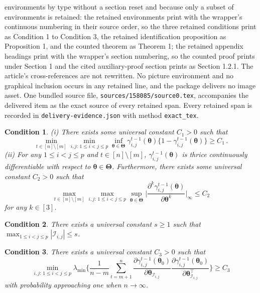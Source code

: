 \documentclass[10pt,a4paper]{amsart}
\theoremstyle{plain}
\newtheorem{condition}{Condition}
\theoremstyle{remark}
\newcommand{\btheta}{\boldsymbol \theta}
\newcommand{\bTheta}{\boldsymbol \Theta}
\def\T{{\scriptscriptstyle \top} }
\begin{document}
environments by type without a section reset and because only a subset of environments is retained: the retained environments print with the wrapper's continuous numbering in their source order, so the three retained conditions print as Condition 1 to Condition 3, the retained identification proposition as Proposition 1, and the counted theorem as Theorem 1; the retained appendix headings print with the wrapper's section numbering, so the counted proof prints under Section 1 and the cited auxiliary-proof section prints as Section 1.2.1. The article's cross-references are not rewritten. No picture environment and no graphical inclusion occurs in any retained line, and the package delivers no image asset. One bundled source file, \texttt{sources/158085/source0.tex}, accompanies the delivered item as the exact source of every retained span. Every retained span is recorded in \texttt{delivery-evidence.json} with method \texttt{exact\_tex}.
\begin{condition}\label{as:gambd}
{\rm(i)} There exists some universal constant $C_{1}>0$ such that
\[
\min_{t\in[n]\setminus[m]}\min_{i,j:\,1\leq i<j\leq p}\inf_{\btheta\in\bTheta}\gamma_{i,j}^{t-1}(\btheta)\{1-\gamma_{i,j}^{t-1}(\btheta)\}\geq C_1\,.
\]
{\rm (ii)} For any $1\leq i<j\leq p$ and $t\in[n]\setminus[m]$, $\gamma_{i,j}^{t-1}(\btheta)$ is thrice continuously
differentiable with respect to $\btheta\in\bTheta$. Furthermore, there exists some universal constant
$C_{2}>0$ such that
\[
\max_{t\in[n]\setminus[m]}\max_{i,j:\,1\leq i<j\leq p}\sup_{\btheta\in\bTheta}\bigg|\frac{\partial^k \gamma_{i,j}^{t-1}(\btheta)}{\partial\btheta^k}\bigg|_\infty\leq C_2
\]
for any $k\in[3]$.
\end{condition}

\begin{condition}\label{as:bdSij}
There exists a universal constant $s\geq1$ such that
$
\max_{1\leq i<j\leq p}|\mathcal{I}_{i,j}|\leq s
$.
\end{condition}

\begin{condition}\label{as:eigen}
There exists a universal constant $C_3>0$ such that
\[
\min_{i,j:\,1\leq i<j\leq p}\lambda_{\min}\bigg\{\frac{1}{n-m}\sum_{t=m+1}^n\frac{\partial\gamma_{i,j}^{t-1}(\btheta_0)}{\partial\btheta_{\mathcal{I}_{i,j}}}\frac{\partial\gamma_{i,j}^{t-1}(\btheta_0)}{\partial\btheta_{\mathcal{I}_{i,j}}^{\T}}\bigg\}\geq C_3
\]
with probability approaching one when $n\to \infty$. 
\end{condition}
\end{document}

